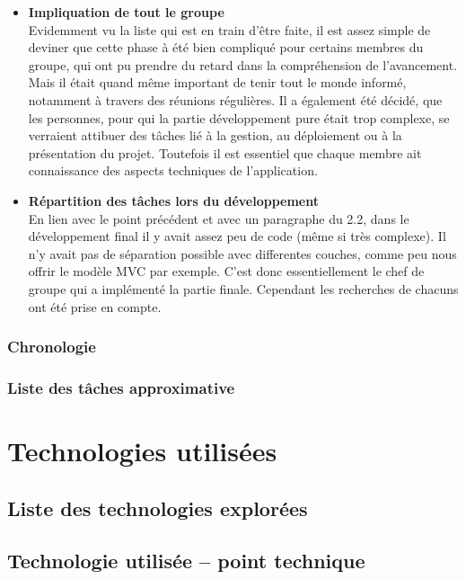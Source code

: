 \documentclass[french]{report}
\begin{document}
\begin{itemize}
  \item{\textbf{Impliquation de tout le groupe}}\\
Evidemment vu la liste qui est en train d'être faite, il est assez simple de deviner
que cette phase à été bien compliqué pour certains membres du groupe, qui ont pu
prendre du retard dans la compréhension de l'avancement. Mais il était quand même
important de tenir tout le monde informé, notamment à travers des réunions régulières.
Il a également été décidé, que les personnes, pour qui la partie développement pure
était trop complexe, se verraient attibuer des tâches lié à la gestion, au déploiement
ou à la présentation du projet. Toutefois il est essentiel que chaque membre ait
connaissance des aspects techniques de l'application.\\

  \item{\textbf{Répartition des tâches lors du développement}}\\
En lien avec le point précédent et avec un paragraphe du 2.2, dans le développement
final il y avait assez peu de code (même si très complexe). Il n'y avait pas de
séparation possible avec differentes couches, comme peu nous offrir le modèle MVC
par exemple. C'est donc essentiellement le chef de groupe qui a implémenté la partie
finale. Cependant les recherches de chacuns ont été prise en compte.\\

\end{itemize}

\subsection{Chronologie}

\subsection{Liste des tâches approximative}

\chapter{Technologies utilisées}

\newpage

\section{Liste des technologies explorées}

\section{Technologie utilisée – point technique}
\end{document}
